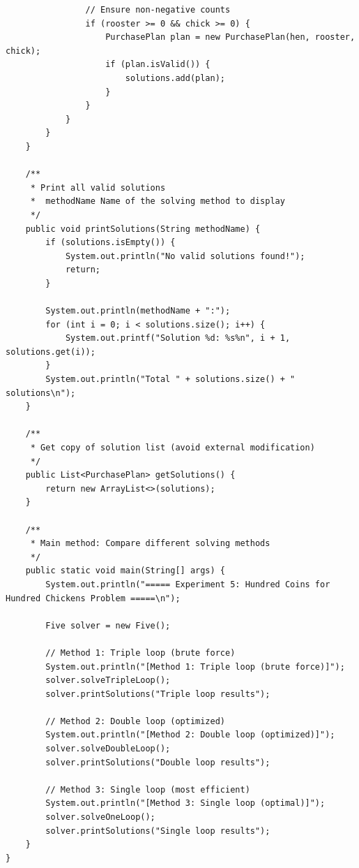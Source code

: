 \documentclass[12pt,a4paper]{article}
\begin{document}
\begin{lstlisting}
                // Ensure non-negative counts
                if (rooster >= 0 && chick >= 0) {
                    PurchasePlan plan = new PurchasePlan(hen, rooster, chick);
                    if (plan.isValid()) {
                        solutions.add(plan);
                    }
                }
            }
        }
    }
    
    /**
     * Print all valid solutions
     *  methodName Name of the solving method to display
     */
    public void printSolutions(String methodName) {
        if (solutions.isEmpty()) {
            System.out.println("No valid solutions found!");
            return;
        }
        
        System.out.println(methodName + ":");
        for (int i = 0; i < solutions.size(); i++) {
            System.out.printf("Solution %d: %s%n", i + 1, solutions.get(i));
        }
        System.out.println("Total " + solutions.size() + " solutions\n");
    }
    
    /**
     * Get copy of solution list (avoid external modification)
     */
    public List<PurchasePlan> getSolutions() {
        return new ArrayList<>(solutions);
    }
    
    /**
     * Main method: Compare different solving methods
     */
    public static void main(String[] args) {
        System.out.println("===== Experiment 5: Hundred Coins for Hundred Chickens Problem =====\n");
        
        Five solver = new Five();

        // Method 1: Triple loop (brute force)
        System.out.println("[Method 1: Triple loop (brute force)]");
        solver.solveTripleLoop();
        solver.printSolutions("Triple loop results");
        
        // Method 2: Double loop (optimized)
        System.out.println("[Method 2: Double loop (optimized)]");
        solver.solveDoubleLoop();
        solver.printSolutions("Double loop results");
        
        // Method 3: Single loop (most efficient)
        System.out.println("[Method 3: Single loop (optimal)]");
        solver.solveOneLoop();
        solver.printSolutions("Single loop results");
    }
}
    
\end{lstlisting}
\end{document}
